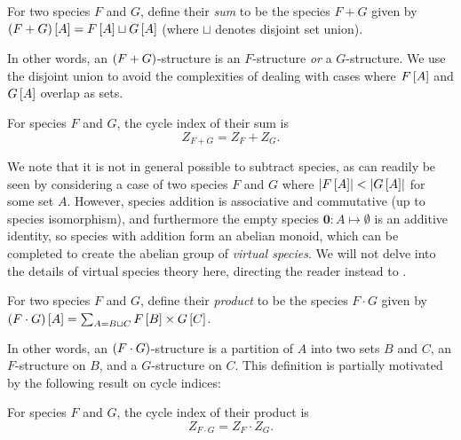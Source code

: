 \documentclass[sectionflow,singlespace,twoside]{brandiss} %
\numberwithin{section}{chapter}
\numberwithin{figure}{chapter}
\begin{document}
\begin{definition}\label{def:specsum}
  For two species $F$ and $G$, define their \emph{sum} to be the species $F + G$ given by $\left( {F + G} \right) \left[ {A} \right] = F \left[ {A} \right] \sqcup G \left[ {A} \right]$ (where $\sqcup$ denotes disjoint set union).
\end{definition}
In other words, an $\left( {F + G} \right)$-structure is an $F$-structure \emph{or} a $G$-structure.
We use the disjoint union to avoid the complexities of dealing with cases where $F \left[ {A} \right]$ and $G \left[ {A} \right]$ overlap as sets.

\begin{theorem}\label{thm:specsumci}
  For species $F$ and $G$, the cycle index of their sum is
  \begin{equation}
    \label{eq:specsumci}
    Z_{F + G} = Z_{F} + Z_{G}.
  \end{equation}
\end{theorem}

We note that it is not in general possible to subtract species, as can readily be seen by considering a case of two species $F$ and $G$ where $\left\vert {F \ensuremath{\left[ {A} \right]}} \right\vert < \left\vert {G \ensuremath{\left[ {A} \right]}} \right\vert$ for some set $A$.
However, species addition is associative and commutative (up to species isomorphism), and furthermore the empty species $\mathbf{0}: A \mapsto \emptyset$ is an additive identity, so species with addition form an abelian monoid, which can be completed to create the abelian group of \emph{virtual species}.
We will not delve into the details of virtual species theory here, directing the reader instead to \cite[\S 2.5]{bll:species}.

\begin{definition}\label{thm:specprod}
  For two species $F$ and $G$, define their \emph{product} to be the species $F \cdot G$ given by $\left( {F \cdot G} \right) \left[ {A} \right] = \sum_{A = B \sqcup C} F \left[ {B} \right] \times G \left[ {C} \right]$.
\end{definition}
In other words, an $\left( {F \cdot G} \right)$-structure is a partition of $A$ into two sets $B$ and $C$, an $F$-structure on $B$, and a $G$-structure on $C$.
This definition is partially motivated by the following result on cycle indices:
\begin{theorem}\label{thm:specprodci}
  For species $F$ and $G$, the cycle index of their product is
  \begin{equation}
    \label{eq:specprodci}
    Z_{F \cdot G} = Z_{F} \cdot Z_{G}.
  \end{equation}
\end{theorem}
\end{document}
